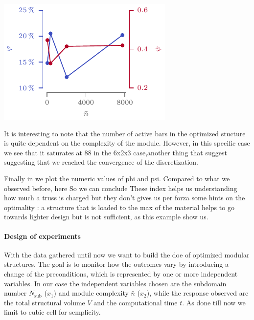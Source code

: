 \begin{marginfigure}
    \centering
    \includegraphics[width=\linewidth]{figures/05_cellular_opt/00_module_complexity_tab/comp_tab_param.pdf}
    \caption{}
    \label{fig:05_comp_param}
\end{marginfigure}

It is interesting to note that the number of active bars in the optimized stucture is quite dependent on the complexity of the module. However, in this specific case we see that it saturates at 88 in the 6x2x3 case,another thing that suggest suggesting that we reached the convergence of the discretization.

Finally in  we plot the numeric values of phi and psi. Compared to what we observed before, here So we can conclude These index helps us understanding how much a truss is charged but they don't gives us per forza some hints on the optimality : a structure that is loaded to the max of the material helps to go towards lighter design but is not sufficient, as this example show us.

\paragraph{Design of experiments}
With the data gathered until now we want to build the \gls{doe} of optimized modular structures. The goal is to monitor how the outcomes vary by introducing a change of the preconditions, which is represented by one or more independent variables. In our case the independent variables chosen are the subdomain number $N_\text{sub}$ ($x_1$) and module complexity $\bar{n}$ ($x_2$), while the response observed are the total structural volume $V$ and the computational time $t$. As done till now we limit to cubic cell for semplicity.

